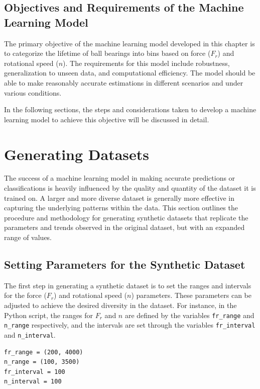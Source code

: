 \subsection*{Objectives and Requirements of the Machine Learning Model}
The primary objective of the machine learning model developed in this chapter is to categorize the lifetime of ball bearings into bins based on force (\(F_r\)) and rotational speed (\(n\)). The requirements for this model include robustness, generalization to unseen data, and computational efficiency. The model should be able to make reasonably accurate estimations in different scenarios and under various conditions.

In the following sections, the steps and considerations taken to develop a machine learning model to achieve this objective will be discussed in detail.

\section{Generating Datasets}

The success of a machine learning model in making accurate predictions or classifications is heavily influenced by the quality and quantity of the dataset it is trained on. A larger and more diverse dataset is generally more effective in capturing the underlying patterns within the data. This section outlines the procedure and methodology for generating synthetic datasets that replicate the parameters and trends observed in the original dataset, but with an expanded range of values.

\subsection*{Setting Parameters for the Synthetic Dataset}

The first step in generating a synthetic dataset is to set the ranges and intervals for the force (\(F_r\)) and rotational speed (\(n\)) parameters. These parameters can be adjusted to achieve the desired diversity in the dataset. For instance, in the Python script, the ranges for \(F_r\) and \(n\) are defined by the variables \texttt{fr\_range} and \texttt{n\_range} respectively, and the intervals are set through the variables \texttt{fr\_interval} and \texttt{n\_interval}. 

\begin{verbatim}
fr_range = (200, 4000)
n_range = (100, 3500)
fr_interval = 100
n_interval = 100
\end{verbatim}

